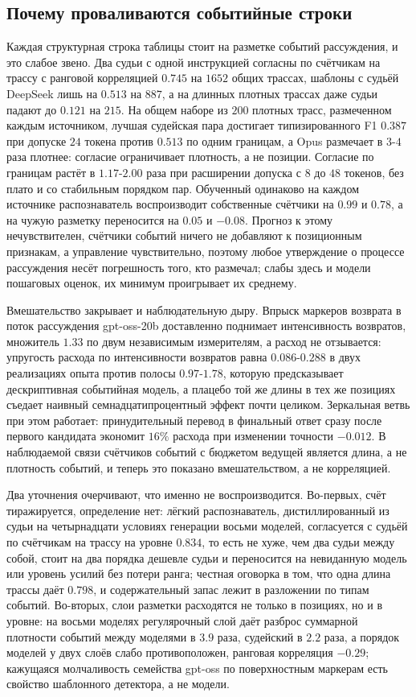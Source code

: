 \documentclass[11pt]{article}
\begin{document}
\subsection{Почему проваливаются событийные строки}
\label{sec:labels}

Каждая структурная строка таблицы стоит на разметке событий рассуждения, и это слабое звено. Два судьи с одной инструкцией согласны по счётчикам на трассу с ранговой корреляцией $0.745$ на $1652$ общих трассах, шаблоны с судьёй DeepSeek лишь на $0.513$ на $887$, а на длинных плотных трассах даже судьи падают до $0.121$ на $215$. На общем наборе из $200$ плотных трасс, размеченном каждым источником, лучшая судейская пара достигает типизированного F1 $0.387$ при допуске $24$ токена против $0.513$ по одним границам, а Opus размечает в $3$-$4$ раза плотнее: согласие ограничивает плотность, а не позиции. Согласие по границам растёт в $1.17$-$2.00$ раза при расширении допуска с $8$ до $48$ токенов, без плато и со стабильным порядком пар. Обученный одинаково на каждом источнике распознаватель воспроизводит собственные счётчики на $0.99$ и $0.78$, а на чужую разметку переносится на $0.05$ и $-0.08$. Прогноз к этому нечувствителен, счётчики событий ничего не добавляют к позиционным признакам, а управление чувствительно, поэтому любое утверждение о процессе рассуждения несёт погрешность того, кто размечал; слабы здесь и модели пошаговых оценок, их минимум проигрывает их среднему.

Вмешательство закрывает и наблюдательную дыру. Впрыск маркеров возврата в поток рассуждения gpt-oss-20b доставленно поднимает интенсивность возвратов, множитель $1.33$ по двум независимым измерителям, а расход не отзывается: упругость расхода по интенсивности возвратов равна $0.086$-$0.288$ в двух реализациях опыта против полосы $0.97$-$1.78$, которую предсказывает дескриптивная событийная модель, а плацебо той же длины в тех же позициях съедает наивный семнадцатипроцентный эффект почти целиком. Зеркальная ветвь при этом работает: принудительный перевод в финальный ответ сразу после первого кандидата экономит $16\%$ расхода при изменении точности $-0.012$. В наблюдаемой связи счётчиков событий с бюджетом ведущей является длина, а не плотность событий, и теперь это показано вмешательством, а не корреляцией.

Два уточнения очерчивают, что именно не воспроизводится. Во-первых, счёт тиражируется, определение нет: лёгкий распознаватель, дистиллированный из судьи на четырнадцати условиях генерации восьми моделей, согласуется с судьёй по счётчикам на трассу на уровне $0.834$, то есть не хуже, чем два судьи между собой, стоит на два порядка дешевле судьи и переносится на невиданную модель или уровень усилий без потери ранга; честная оговорка в том, что одна длина трассы даёт $0.798$, и содержательный запас лежит в разложении по типам событий. Во-вторых, слои разметки расходятся не только в позициях, но и в уровне: на восьми моделях регулярочный слой даёт разброс суммарной плотности событий между моделями в $3.9$ раза, судейский в $2.2$ раза, а порядок моделей у двух слоёв слабо противоположен, ранговая корреляция $-0.29$; кажущаяся молчаливость семейства gpt-oss по поверхностным маркерам есть свойство шаблонного детектора, а не модели.
\end{document}

